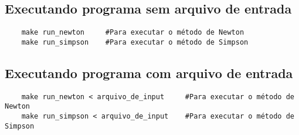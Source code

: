\subsection{Executando programa sem arquivo de entrada}
\begin{verbatim}
	make run_newton     #Para executar o método de Newton
	make run_simpson    #Para executar o método de Simpson
\end{verbatim}

\subsection{Executando programa com arquivo de entrada}
\label{subsec:ex_com}
\begin{verbatim}
	make run_newton < arquivo_de_input     #Para executar o método de Newton
	make run_simpson < arquivo_de_input    #Para executar o método de Simpson
\end{verbatim}

